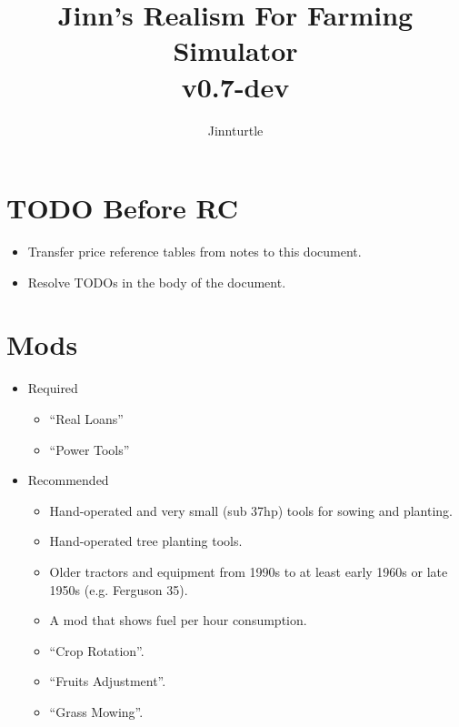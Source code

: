 \documentclass[a4paper,10pt]{article}
\begin{document}
\newlength{\tabcolsepDefault}
\setlength{\tabcolsepDefault}{\tabcolsep}




\newcommand{\textbi}[1]{\textbf{\textit{#1}}}

\newcommand{\projName}{Jinn's Realism For Farming Simulator}
\newcommand{\projVersion}{v0.7-dev}

\newcommand{\refPageref}[1]{\ref{#1} (p. \pageref{#1})}


\title{\projName{}\\ \projVersion{}}
\author{Jinnturtle}

\maketitle
\tableofcontents


\section{TODO Before RC}
\begin{itemize}
\item Transfer price reference tables from notes to this document.
\item Resolve TODOs in the body of the document.
\end{itemize}


\section{Mods}

\begin{itemize}
\item Required
  \begin{itemize}
  \item ``Real Loans''
  \item ``Power Tools''
  \end{itemize}
\item Recommended
  \begin{itemize}
    \item Hand-operated and very small (sub 37hp) tools for sowing and planting.
    \item Hand-operated tree planting tools.
    \item Older tractors and equipment from 1990s to at least early 1960s or
      late 1950s (e.g.  Ferguson 35).
    \item A mod that shows fuel per hour consumption.
    \item ``Crop Rotation''.
    \item ``Fruits Adjustment''.
    \item ``Grass Mowing''.
  \end{itemize}
\end{itemize}
\end{document}
